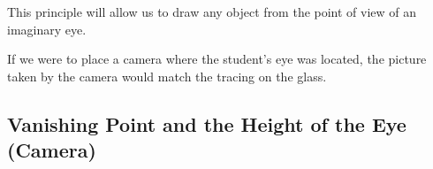 \documentclass{ximera}
\begin{document}
This principle will allow us to draw any object from the point of view of an imaginary eye.

If we were to place a camera where the student's eye was located, the picture taken by the camera would match the tracing on the glass.

\subsection*{Vanishing Point and the Height of the Eye (Camera)}
\end{document}
